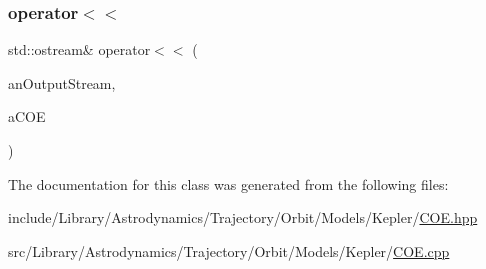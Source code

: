\subsubsection{\texorpdfstring{operator$<$$<$}{operator<<}}
{\footnotesize\ttfamily std\+::ostream\& operator$<$$<$ (\begin{DoxyParamCaption}\item[{std\+::ostream \&}]{an\+Output\+Stream,  }\item[{const \hyperlink{classlibrary_1_1astro_1_1trajectory_1_1orbit_1_1models_1_1kepler_1_1_c_o_e}{C\+OE} \&}]{a\+C\+OE }\end{DoxyParamCaption})\hspace{0.3cm}{\ttfamily [friend]}}



The documentation for this class was generated from the following files\+:\begin{DoxyCompactItemize}
\item 
include/\+Library/\+Astrodynamics/\+Trajectory/\+Orbit/\+Models/\+Kepler/\hyperlink{_c_o_e_8hpp}{C\+O\+E.\+hpp}\item 
src/\+Library/\+Astrodynamics/\+Trajectory/\+Orbit/\+Models/\+Kepler/\hyperlink{_c_o_e_8cpp}{C\+O\+E.\+cpp}\end{DoxyCompactItemize}
